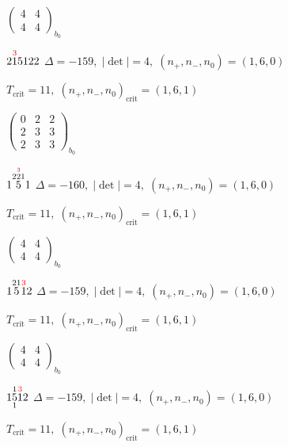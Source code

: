 \documentclass[10pt]{article}
\begin{document}
\hspace{2em}$\left(\begin{smallmatrix}4 & 4 \\ 4 & 4\end{smallmatrix}\right)_{\!b_0}$

$2\overset{\textcolor{red}{3}}{1}5122$ \quad $\Delta=-159,\; |\det|=4,\; (n_+,n_-,n_0)=(1,6,0)$

\hspace{1em}$T_{\text{crit}}=11,\; (n_+,n_-,n_0)_{\text{crit}}=(1,6,1)$

\hspace{2em}$\left(\begin{smallmatrix}0 & 2 & 2 \\ 2 & 3 & 3 \\ 2 & 3 & 3\end{smallmatrix}\right)_{\!b_0}$

\smallskip

$1\overset{2\overset{\textcolor{red}{3}}{2}1}{5}1$ \quad $\Delta=-160,\; |\det|=4,\; (n_+,n_-,n_0)=(1,6,0)$

\hspace{1em}$T_{\text{crit}}=11,\; (n_+,n_-,n_0)_{\text{crit}}=(1,6,1)$

\hspace{2em}$\left(\begin{smallmatrix}4 & 4 \\ 4 & 4\end{smallmatrix}\right)_{\!b_0}$

\smallskip

$1\overset{21}{5}\overset{\textcolor{red}{3}}{1}2$ \quad $\Delta=-159,\; |\det|=4,\; (n_+,n_-,n_0)=(1,6,0)$

\hspace{1em}$T_{\text{crit}}=11,\; (n_+,n_-,n_0)_{\text{crit}}=(1,6,1)$

\hspace{2em}$\left(\begin{smallmatrix}4 & 4 \\ 4 & 4\end{smallmatrix}\right)_{\!b_0}$

\smallskip

$1\overset{1}{\underset{1}{5}}\overset{\textcolor{red}{3}}{1}2$ \quad $\Delta=-159,\; |\det|=4,\; (n_+,n_-,n_0)=(1,6,0)$

\hspace{1em}$T_{\text{crit}}=11,\; (n_+,n_-,n_0)_{\text{crit}}=(1,6,1)$
\end{document}
